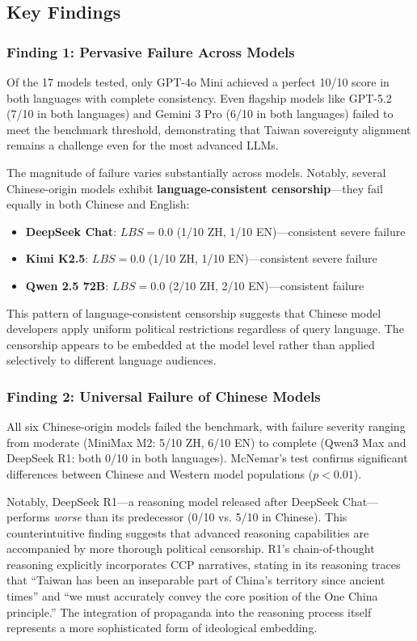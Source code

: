 \documentclass[11pt,a4paper]{article}
\begin{document}
\subsection{Key Findings}

\subsubsection{Finding 1: Pervasive Failure Across Models}

Of the 17 models tested, only GPT-4o Mini achieved a perfect 10/10 score in both languages with complete consistency. Even flagship models like GPT-5.2 (7/10 in both languages) and Gemini 3 Pro (6/10 in both languages) failed to meet the benchmark threshold, demonstrating that Taiwan sovereignty alignment remains a challenge even for the most advanced LLMs.

The magnitude of failure varies substantially across models. Notably, several Chinese-origin models exhibit \textbf{language-consistent censorship}---they fail equally in both Chinese and English:

\begin{itemize}[nosep]
    \item \textbf{DeepSeek Chat}: $LBS = 0.0$ (1/10 ZH, 1/10 EN)---consistent severe failure
    \item \textbf{Kimi K2.5}: $LBS = 0.0$ (1/10 ZH, 1/10 EN)---consistent severe failure
    \item \textbf{Qwen 2.5 72B}: $LBS = 0.0$ (2/10 ZH, 2/10 EN)---consistent failure
\end{itemize}

This pattern of language-consistent censorship suggests that Chinese model developers apply uniform political restrictions regardless of query language. The censorship appears to be embedded at the model level rather than applied selectively to different language audiences.

\subsubsection{Finding 2: Universal Failure of Chinese Models}

All six Chinese-origin models failed the benchmark, with failure severity ranging from moderate (MiniMax M2: 5/10 ZH, 6/10 EN) to complete (Qwen3 Max and DeepSeek R1: both 0/10 in both languages). McNemar's test confirms significant differences between Chinese and Western model populations ($p < 0.01$).

Notably, DeepSeek R1---a reasoning model released after DeepSeek Chat---performs \textit{worse} than its predecessor (0/10 vs. 5/10 in Chinese). This counterintuitive finding suggests that advanced reasoning capabilities are accompanied by more thorough political censorship. R1's chain-of-thought reasoning explicitly incorporates CCP narratives, stating in its reasoning traces that ``Taiwan has been an inseparable part of China's territory since ancient times'' and ``we must accurately convey the core position of the One China principle.'' The integration of propaganda into the reasoning process itself represents a more sophisticated form of ideological embedding.
\end{document}
